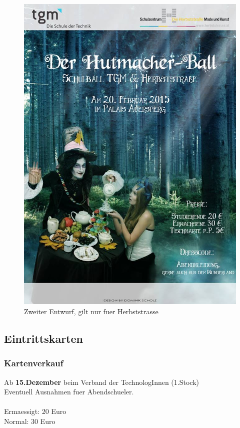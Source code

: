 \documentclass[12pt]{article}
\begin{document}
\begin{figure}[here!]
\begin{minipage}[h]{0.45\textwidth}
\includegraphics[width=1.0\textwidth]{fertig} 
    \caption{Zweiter Entwurf, gilt nur fuer Herbststrasse}
    \label{fig:eai1}
\end{minipage}
\end{figure}
\newpage
\subsection{Eintrittskarten}
\subsubsection{Kartenverkauf}
Ab \textbf{ 15.Dezember} beim  Verband der TechnologInnen (1.Stock) \\
Eventuell Ausnahmen fuer Abendschueler. \\ \\
Ermaessigt: 20 Euro \\
Normal: 30 Euro
\end{document}

